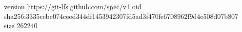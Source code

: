 version https://git-lfs.github.com/spec/v1
oid sha256:3335cebc074ceed344df1453942307fd5ad3f470fe6708962f9d4c508d07b807
size 262240
